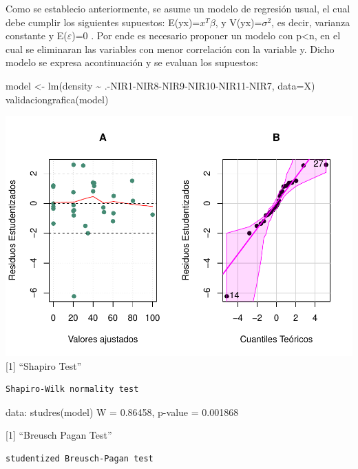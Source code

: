 \documentclass[
]{article}
\newenvironment{Shaded}{\begin{snugshade}}{\end{snugshade}}
\newcommand{\AttributeTok}[1]{\textcolor[rgb]{0.77,0.63,0.00}{#1}}
\newcommand{\FunctionTok}[1]{\textcolor[rgb]{0.00,0.00,0.00}{#1}}
\newcommand{\NormalTok}[1]{#1}
\newcommand{\OtherTok}[1]{\textcolor[rgb]{0.56,0.35,0.01}{#1}}
\newcommand{\SpecialCharTok}[1]{\textcolor[rgb]{0.00,0.00,0.00}{#1}}
\begin{document}
Como se establecio anteriormente, se asume un modelo de regresión usual,
el cual debe cumplir los siguientes supuestos:
E(y\textbar x)=\(x^T\beta\), y V(y\textbar x)=\(\sigma^2\), es decir,
varianza constante y E(\(\varepsilon\))=0 . Por ende es necesario
proponer un modelo con p\textless n, en el cual se eliminaran las
variables con menor correlación con la variable y. Dicho modelo se
expresa acontinuación y se evaluan los supuestos:

\begin{Shaded}
\begin{Highlighting}[]
\NormalTok{model }\OtherTok{\textless{}{-}} \FunctionTok{lm}\NormalTok{(density }\SpecialCharTok{\textasciitilde{}}\NormalTok{ .}\SpecialCharTok{{-}}\NormalTok{NIR1}\SpecialCharTok{{-}}\NormalTok{NIR8}\SpecialCharTok{{-}}\NormalTok{NIR9}\SpecialCharTok{{-}}\NormalTok{NIR10}\SpecialCharTok{{-}}\NormalTok{NIR11}\SpecialCharTok{{-}}\NormalTok{NIR7, }\AttributeTok{data=}\NormalTok{X)}
\FunctionTok{validaciongrafica}\NormalTok{(model)}
\end{Highlighting}
\end{Shaded}

\includegraphics{Taller-2-Regresion-Multiple-Aplicada_files/figure-latex/unnamed-chunk-4-1.pdf}
{[}1{]} ``Shapiro Test''

\begin{verbatim}
Shapiro-Wilk normality test
\end{verbatim}

data: studres(model) W = 0.86458, p-value = 0.001868

{[}1{]} ``Breusch Pagan Test''

\begin{verbatim}
studentized Breusch-Pagan test
\end{verbatim}
\end{document}
